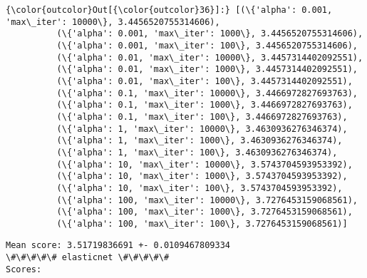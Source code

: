 \documentclass[11pt]{article}
\begin{document}
            \begin{Verbatim}[commandchars=\\\{\}]
{\color{outcolor}Out[{\color{outcolor}36}]:} [(\{'alpha': 0.001, 'max\_iter': 10000\}, 3.4456520755314606),
          (\{'alpha': 0.001, 'max\_iter': 1000\}, 3.4456520755314606),
          (\{'alpha': 0.001, 'max\_iter': 100\}, 3.4456520755314606),
          (\{'alpha': 0.01, 'max\_iter': 10000\}, 3.4457314402092551),
          (\{'alpha': 0.01, 'max\_iter': 1000\}, 3.4457314402092551),
          (\{'alpha': 0.01, 'max\_iter': 100\}, 3.4457314402092551),
          (\{'alpha': 0.1, 'max\_iter': 10000\}, 3.4466972827693763),
          (\{'alpha': 0.1, 'max\_iter': 1000\}, 3.4466972827693763),
          (\{'alpha': 0.1, 'max\_iter': 100\}, 3.4466972827693763),
          (\{'alpha': 1, 'max\_iter': 10000\}, 3.4630936276346374),
          (\{'alpha': 1, 'max\_iter': 1000\}, 3.4630936276346374),
          (\{'alpha': 1, 'max\_iter': 100\}, 3.4630936276346374),
          (\{'alpha': 10, 'max\_iter': 10000\}, 3.5743704593953392),
          (\{'alpha': 10, 'max\_iter': 1000\}, 3.5743704593953392),
          (\{'alpha': 10, 'max\_iter': 100\}, 3.5743704593953392),
          (\{'alpha': 100, 'max\_iter': 10000\}, 3.7276453159068561),
          (\{'alpha': 100, 'max\_iter': 1000\}, 3.7276453159068561),
          (\{'alpha': 100, 'max\_iter': 100\}, 3.7276453159068561)]
\end{Verbatim}
        
    \begin{Verbatim}[commandchars=\\\{\}]
Mean score: 3.51719836691 +- 0.0109467809334
\#\#\#\#\# elasticnet \#\#\#\#\#
Scores:

    \end{Verbatim}
\end{document}

